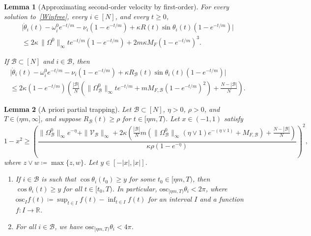 \documentclass[10pt,a4paper]{amsart}
\newtheorem{lemma}{Lemma}
\newcommand{\R}{\mathbb{R}}
\begin{document}
\begin{lemma}[Approximating second-order velocity by first-order]\label{lem:orderlowering}
For every solution to~\eqref{Winfree}, every $i\in[N]$, and every $t\ge 0$,
\begin{multline*}
\bigl|\dot\theta_i(t)-\omega_i^0 e^{-t/m}-\nu_i(1-e^{-t/m})+\kappa R(t)\sin\theta_i(t)(1-e^{-t/m})\bigr|\\
\le 2\kappa\,\|\Omega^0\|_\infty t e^{-t/m}(1-e^{-t/m})+2m\kappa M_F(1-e^{-t/m})^{3}.
\end{multline*}

If $\mathcal{B}\subset [N]$ and $i\in \mathcal{B}$, then
\begin{multline*}
	\bigl|\dot\theta_i(t)-\omega_i^0 e^{-t/m}-\nu_i(1-e^{-t/m})+\kappa R_\mathcal{B}(t)\sin\theta_i(t)(1-e^{-t/m})\bigr|\\
	\le 2\kappa (1-e^{-t/m})\left(\frac{|\mathcal{B}|}{N} \left(\|\Omega_\mathcal{B}^0\|_\infty te^{-t/m}+m M_{F,\mathcal{B}}(1-e^{-t/m})^2\right)+\frac{N-|\mathcal{B}|}{N} \right).
\end{multline*}
\end{lemma}

\begin{lemma}[A priori partial trapping]\label{lem:single}
Let $\mathcal{B}\subset [N]$, $\eta>0$, $\rho>0$, and $T\in (\eta m,\infty]$, and suppose $R_\mathcal{B}(t)\ge\rho$ for
$t\in[\eta m,T)$. Let $x\in (-1,1)$ satisfy
\begin{equation}\label{eq:xbound}
1-x^2\ge\left(\frac{\|\Omega_\mathcal{B}^0\|_\infty e^{-\eta}+\|\mathcal V_\mathcal{B}\|_\infty+2\kappa\left(\frac{|\mathcal{B}|}{N}m\left(\|\Omega_\mathcal{B}^0\|_\infty(\eta\vee 1)e^{-(\eta\vee 1)}+ M_{F,\mathcal{B}}\right)+\frac{N-|\mathcal{B}|}{N}\right)}{\kappa\rho(1-e^{-\eta})}\right)^{\!2},
\end{equation}
where $z\vee w\coloneqq \max\{z,w\}$.
Let $y\in[-|x|,|x|]$.
\begin{enumerate}
\item If $i\in \mathcal{B}$ is such that $\cos\theta_i(t_0)\ge y$ for
some $t_0\in[\eta m,T)$, then $\cos\theta_i(t)\ge y$ for all
$t\in[t_0,T)$. In particular, $\mathrm{osc}_{[\eta m,T)} \theta_i<2\pi$, where $\mathrm{osc}_{I}f(t)\coloneqq \sup_{t\in I}f(t)-\inf_{t\in I} f(t)$ for an interval $I$ and a function $f:I\to \R$.
\item For all $i\in \mathcal{B}$, we have $\mathrm{osc}_{[\eta m,T)} \theta_i<4\pi$.
\end{enumerate}
\end{lemma}
\end{document}
